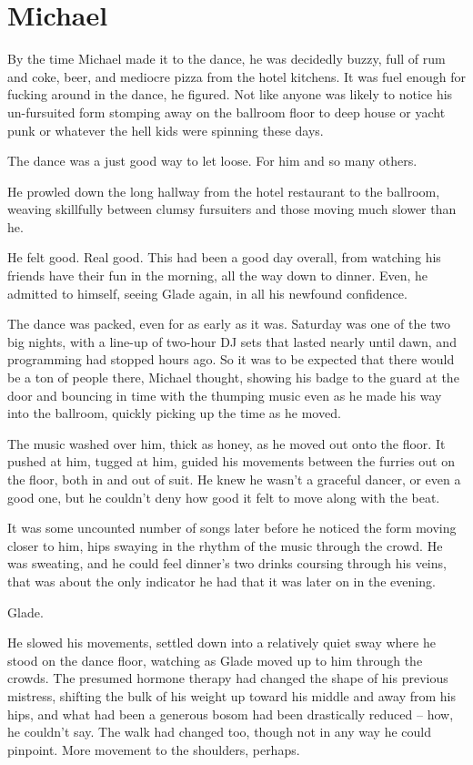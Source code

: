\chapter{Michael}

By the time Michael made it to the dance, he was decidedly buzzy, full of rum and coke, beer, and mediocre pizza from the hotel kitchens.  It was fuel enough for fucking around in the dance, he figured.  Not like anyone was likely to notice his un-fursuited form stomping away on the ballroom floor to deep house or yacht punk or whatever the hell kids were spinning these days.

The dance was a just good way to let loose.  For him and so many others.

He prowled down the long hallway from the hotel restaurant to the ballroom, weaving skillfully between clumsy fursuiters and those moving much slower than he.

He felt good.  Real good.  This had been a good day overall, from watching his friends have their fun in the morning, all the way down to dinner.  Even, he admitted to himself, seeing Glade again, in all his newfound confidence.

The dance was packed, even for as early as it was.  Saturday was one of the two big nights, with a line-up of two-hour DJ sets that lasted nearly until dawn, and programming had stopped hours ago.  So it was to be expected that there would be a ton of people there, Michael thought, showing his badge to the guard at the door and bouncing in time with the thumping music even as he made his way into the ballroom, quickly picking up the time as he moved.

The music washed over him, thick as honey, as he moved out onto the floor.  It pushed at him, tugged at him, guided his movements between the furries out on the floor, both in and out of suit.  He knew he wasn't a graceful dancer, or even a good one, but he couldn't deny how good it felt to move along with the beat.

It was some uncounted number of songs later before he noticed the form moving closer to him, hips swaying in the rhythm of the music through the crowd.  He was sweating, and he could feel dinner's two drinks coursing through his veins, that was about the only indicator he had that it was later on in the evening.

Glade.

He slowed his movements, settled down into a relatively quiet sway where he stood on the dance floor, watching as Glade moved up to him through the crowds.  The presumed hormone therapy had changed the shape of his previous mistress, shifting the bulk of his weight up toward his middle and away from his hips, and what had been a generous bosom had been drastically reduced -- how, he couldn't say.  The walk had changed too, though not in any way he could pinpoint.  More movement to the shoulders, perhaps.

